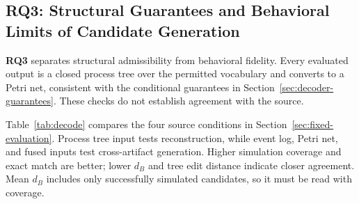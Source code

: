 \documentclass[mathematics,article,submit,moreauthors]{Definitions/mdpi}
\newcommand{\RQthree}{\textbf{RQ3}}
\begin{document}
\subsection{\RQthree: Structural Guarantees and Behavioral Limits of Candidate Generation}\label{sec:decode-results}

\RQthree{} separates structural admissibility from behavioral fidelity. Every evaluated output is a closed process tree over the permitted vocabulary and converts to a Petri net, consistent with the conditional guarantees in Section~\ref{sec:decoder-guarantees}. These checks do not establish agreement with the source.

Table~\ref{tab:decode} compares the four source conditions in Section~\ref{sec:fixed-evaluation}. Process tree input tests reconstruction, while event log, Petri net, and fused inputs test cross-artifact generation. Higher simulation coverage and exact match are better; lower $d_B$ and tree edit distance indicate closer agreement. Mean $d_B$ includes only successfully simulated candidates, so it must be read with coverage.
\end{document}
